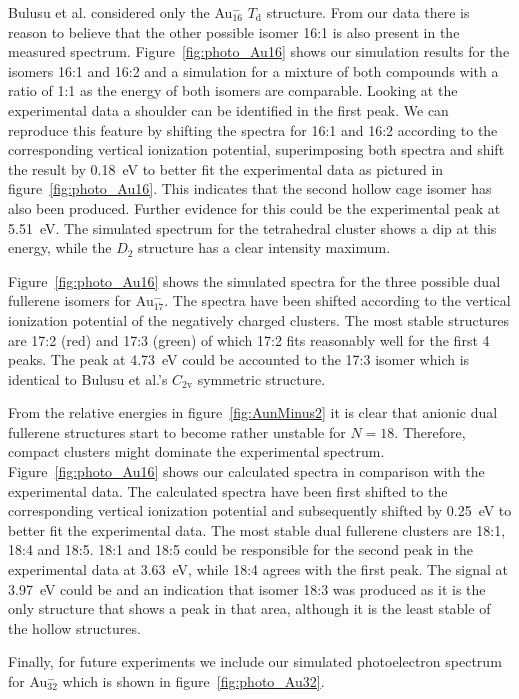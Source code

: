 Bulusu et al. considered only the Au$_{16}^-$ $T_\mathrm{d}$ structure. From
our data there is reason to believe that the other possible isomer 16:1 is also
present in the measured spectrum. Figure~\ref{fig:photo_Au16} shows our
simulation results for the isomers 16:1 and 16:2 and a simulation for a mixture
of both compounds with a ratio of 1:1 as the energy of both isomers are
comparable.  Looking at the experimental data a shoulder can be identified in
the first peak. We can reproduce this feature by shifting the spectra for 16:1
and 16:2 according to the corresponding vertical ionization potential,
superimposing both spectra and shift the result by 0.18~eV to better fit the
experimental data as pictured in figure~\ref{fig:photo_Au16}. This indicates
that the second hollow cage isomer has also been produced.  Further evidence
for this could be the experimental peak at 5.51~eV. The simulated spectrum for
the tetrahedral cluster shows a dip at this energy, while the $D_\mathrm{2}$
structure has a clear intensity maximum. 

Figure~\ref{fig:photo_Au16} shows the simulated spectra for the three possible
dual fullerene isomers for Au$_{17}^-$. The spectra have been shifted according
to the vertical ionization potential of the negatively charged clusters. The
most stable structures are 17:2 (red) and 17:3 (green) of which 17:2 fits
reasonably well for the first 4 peaks. The peak at 4.73~eV could be accounted
to the 17:3 isomer which is identical to Bulusu et al.'s $C_\mathrm{2v}$
symmetric structure.

From the relative energies in figure~\ref{fig:AunMinus2} it is clear that
anionic dual fullerene structures start to become rather unstable for $N=18$.
Therefore, compact clusters might dominate the experimental spectrum.
Figure~\ref{fig:photo_Au16} shows our calculated spectra in comparison with the
experimental data. The calculated spectra have been first shifted to the
corresponding vertical ionization potential and subsequently shifted by 0.25~eV
to better fit the experimental data. The most stable dual fullerene clusters
are 18:1, 18:4 and 18:5. 18:1 and 18:5 could be responsible for the second peak
in the experimental data at 3.63~eV, while 18:4 agrees with the first peak. The
signal at 3.97~eV could be and an indication that isomer 18:3 was produced as
it is the only structure that shows a peak in that area, although it is the
least stable of the hollow structures.

Finally, for future experiments we include our simulated photoelectron spectrum
for Au$_{32}^-$ which is shown in figure~\ref{fig:photo_Au32}. 

